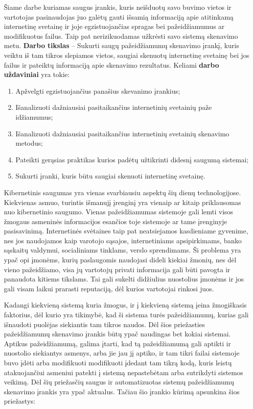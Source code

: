 Šiame darbe kuriamas saugus įrankis, kuris neišduotų savo buvimo vietos ir vartotojas pasinaudojas juo galėtų gauti išsamią informaciją apie atitinkamą internetinę svetainę ir joje egzistuojančias spragas
bei pažeidžiamumus ar modifikuotus failus. Taip pat nerizikuodamas užkrėsti savo sistemą skenavimo metu. \textbf{Darbo tikslas} – Sukurti saugų pažeidžiamumų skenavimo įrankį, kuris veiktu iš tam tikros slepiamos vietos, saugiai skenuotų internetinę
svetainę bei jos failus ir pateiktų informaciją apie skenavimo rezultatus. Keliami \textbf{darbo uždaviniai} yra tokie:

\begin{enumerate}
	\item Apžvelgti egzistuojančius panašius skevanimo įrankius;
	\item Išanalizuoti dažniausiai pasitaikančius internetinių svetainių paže
	idžiamumus;
	\item Išanalizuoti dažniausiai pasitaikančius internetinių svetainių skenavimo metodus;
	\item Pateikti gerąsias praktikas kurios padėtų užtikrinti didesnį saugumą sistemai;
	\item Sukurti įranki, kuris būtu saugiai skenuoti internetinę svetainę.
\end{enumerate}


Kibernetinis saugumas yra vienas svarbiausiu aspektų šių dienų technologijose. Kiekvienas asmuo, turintis išmanujį įrenginį yra vienaip ar kitaip priklausomas nuo kibernetinio saugumo. Vienas pažeidžiamumas sistemoje gali lemti visos žmogaus asmeninės informacijos esančios toje sistemoje ar tame įrenginyje pasisavinimą. Internetinės svėtaines taip pat neatsiejamos kasdieniame gyvenime, nes jos naudojamos kaip varotojo sąsajos, internetiniams apsipirkimams, banko sąskaitų valdymui, socialiniams tinklams, verslo sprendimams. Ši problema yra ypač opi įmonėms, kurių paslaugomis naudojasi dideli kiekiai žmonių, nes dėl vieno pažeidžiamo, visa jų vartotojų privati informacija gali būti pavogta ir panaudota kitiems tikslams. Tai gali sukelti didžiulius nuostolius įmonėms ir jos gali visam laikui prarasti reputaciją, dėl kurios vartotojai rinkosi juos.

Kadangi kiekvieną sistemą kuria
žmogus, ir į kiekvieną sistemą įeina žmogiškasis faktorius, dėl kurio yra tikimybė, kad ši sistema turės
pažeidžiamumų, kurias gali išnaudoti puolėjas siekiantis tam tikros naudos. Dėl šios priežasties
pažeidžiamumų skenavimo įrankis būtų ypač naudingas bet kokiai sistemai. Aptikus pažeidžiamumą, galima įtarti, kad
tą pažeidžiamumą gali aptikti ir nuostolio siekiantys asmenys, arba jie jau jį aptiko, ir tam tikri
failai sistemoje buvo įdėti arba modifikuoti modifikuoti įdedant tam tikrą kodą, kuris leistų atakuojančiui asmeniui patekti į sistemą
nepastebėtam arba sutrikdyti sistemos veikimą.
Dėl šių priežasčių saugus ir automatizuotas sistemų pažeidžiamumų skenavimo įrankis yra
ypač aktualus. Tačiau šio įrankio kūrimą apsunkina šios priežastys:

